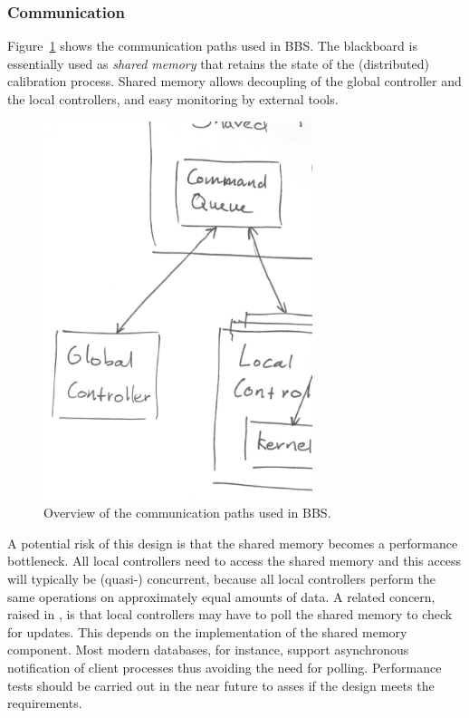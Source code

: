 \documentclass[10pt]{lofar}
\begin{document}
\subsubsection{Communication}
\label{subsubsec:distribution-communication}

Figure~\ref{fig:distribution-communication} shows the communication paths used
in BBS. The blackboard is essentially used as \emph{shared memory} that retains
the state of the (distributed) calibration process. Shared memory allows
decoupling of the global controller and the local controllers, and easy
monitoring by external tools.

\begin{figure}[htb!]
\centering
\includegraphics[width=0.7\textwidth]{images/communication.ps}
\caption{Overview of the communication paths used in BBS.}
\label{fig:distribution-communication}
\end{figure}

A potential risk of this design is that the shared memory becomes a performance
bottleneck.  All local controllers need to access the shared memory and this
access will typically be (quasi-) concurrent, because all local controllers
perform the same operations on approximately equal amounts of data. A related
concern, raised in \cite[p.19]{LOFAR-ASTRON-SDD-052}, is that local controllers
may have to poll the shared memory to check for updates. This depends on the
implementation of the shared memory component. Most modern databases, for
instance, support asynchronous notification of client processes thus avoiding
the need for polling. Performance tests should be carried out in the near future
to asses if the design meets the requirements.
\end{document}
